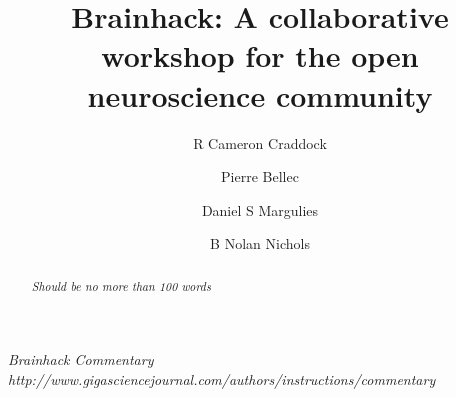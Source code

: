 \documentclass[11pt]{bmc_article_s50}
\begin{document}
\title{Brainhack: A collaborative workshop for the open neuroscience community}

\maketitle

\author[1,2*]{R Cameron Craddock}\cor{}
\author[3]{Pierre Bellec}
\author[4]{Daniel S Margulies}
\author[4]{B Nolan Nichols}

\address[1]{
  Computational Neuroimaging Lab, Center for Biomedical Imaging and \\\hspace*{59pt}Neuromodulation, Nathan S. Kline Institute for Psychiatric Research, \\\hspace*{59pt}140 Old Orangeburg Rd, 10962, Orangeburg, New York, USA
}
\address[2]{
  Center for the Developing Brain, Child Mind Institute, 445 Park Ave,\\\hspace*{59pt} 10022, New York, New York, USA
}

\address[3]{Centre de recherche de l’institut de g\'{e}riatrie de   Montr\'{e}al, Montr\'{e}al, QC, Canada
}

\address[4]{
  Max Planck Research Group for Neuroanatomy \& Connectivity,\\\hspace*{59pt} Max Planck Institute for Human Cognitive and Brain Sciences, \\\hspace*{59pt} Stephanstraße 1A, 04103, Leipzig, Germany
}

\address[5]{
  SRI International, 333 Ravenswood Ave, 94025, Menlo Park,  California, USA
}
  
\address[6]{
  Department of Psychiatry and Behavioral Sciences, Stanford University,\\\hspace*{59pt} 
  1265 Welch Road, 94306, Stanford,  California, USA
}


\begin{abstract}
\emph{Should be no more than 100 words}
\end{abstract}



\emph{Brainhack Commentary}
\emph{http://www.gigasciencejournal.com/authors/instructions/commentary}
\end{document}
